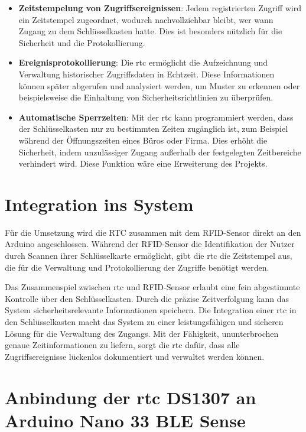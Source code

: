 \begin{itemize}
  \item \textbf{Zeitstempelung von Zugriffsereignissen}: Jedem registrierten Zugriff wird ein Zeitstempel zugeordnet, wodurch nachvollziehbar bleibt, wer wann Zugang zu dem Schlüsselkasten hatte. Dies ist besonders nützlich für die Sicherheit und die Protokollierung.

  \item \textbf{Ereignisprotokollierung}: Die \ac{rtc} ermöglicht die Aufzeichnung und Verwaltung historischer Zugriffsdaten in Echtzeit. Diese Informationen können später abgerufen und analysiert werden, um Muster zu erkennen oder beispielsweise die Einhaltung von Sicherheitsrichtlinien zu überprüfen.

  \item  \textbf{Automatische Sperrzeiten}: Mit der \ac{rtc} kann programmiert werden, dass der Schlüsselkasten nur zu bestimmten Zeiten zugänglich ist, zum Beispiel während der Öffnungszeiten eines Büros oder Firma. Dies erhöht die Sicherheit, indem unzulässiger Zugang außerhalb der festgelegten Zeitbereiche verhindert wird. Diese Funktion wäre eine Erweiterung des Projekts.
\cite{monk2017}
\end{itemize}


\section{Integration ins System}

Für die Umsetzung wird die RTC zusammen mit dem RFID-Sensor direkt an den Arduino angeschlossen. Während der RFID-Sensor die Identifikation der Nutzer durch Scannen ihrer Schlüsselkarte ermöglicht, gibt die \ac{rtc} die Zeitstempel aus, die für die Verwaltung und Protokollierung der Zugriffe benötigt werden.

Das Zusammenspiel zwischen \ac{rtc} und RFID-Sensor erlaubt eine fein abgestimmte Kontrolle über den Schlüsselkasten. Durch die präzise Zeitverfolgung kann das System sicherheitsrelevante Informationen speichern.
Die Integration einer \ac{rtc} in den Schlüsselkasten macht das System zu einer leistungsfähigen und sicheren Lösung für die Verwaltung des Zugangs. Mit der Fähigkeit, ununterbrochen genaue Zeitinformationen zu liefern, sorgt die \ac{rtc} dafür, dass alle Zugriffsereignisse lückenlos dokumentiert und verwaltet werden können. \cite{adafruitRTC2020}

\section{Anbindung der \ac{rtc} DS1307 an Arduino Nano 33 BLE Sense}

